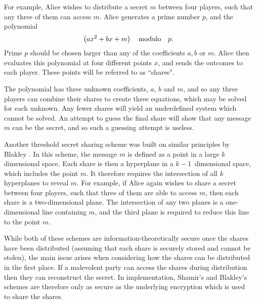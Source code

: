 For example, Alice wishes to distribute a secret $m$ between four players, such that any three of them can access $m$. Alice generates a prime number $p$, and the polynomial 
\begin{equation}
\left( a x^2 + b x + m \right) \qq{modulo} p.
\end{equation}
Prime $p$ should be chosen larger than any of the coefficients $a, b$ or $m$. Alice then evaluates this polynomial at four different points $x$, and sends the outcomes to each player. These points will be referred to as ``shares". %

The polynomial has three unknown coefficients, $a$, $b$ and $m$, and so any three players can combine their shares to create three equations, which may be solved for each unknown. Any fewer shares will yield an underdefined system which cannot be solved. An attempt to guess the final share will show that any message $m$ can be the secret, and so such a guessing attempt is useless.

Another threshold secret sharing scheme was built on similar principles by Blakley \cite{Blakley1979}. In this scheme, the message $m$ is defined as a point in a large $k$ dimensional space. Each share is then a hyperplane in a $k-1$~dimensional space, which includes the point $m$. It therefore requires the intersection of all $k$ hyperplanes to reveal $m$. For example, if Alice again wishes to share a secret between four players, such that three of them are able to access $m$, then each share is a two-dimensional plane. The intersection of any two planes is a one-dimensional line containing $m$, and the third plane is required to reduce this line to the point $m$.

While both of these schemes are information-theoretically secure once the shares have been distributed (assuming that each share is securely stored and cannot be stolen), the main issue arises when considering how the shares can be distributed in the first place. If a malevolent party can access the shares during distribution then they can reconstruct the secret. In implementation, Shamir's and Blakley's schemes are therefore only as secure as the underlying encryption which is used to share the shares.

%

